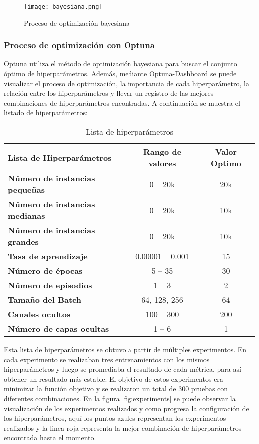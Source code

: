 \begin{figure}[ht]
    \centering
    \texttt{[image: bayesiana.png]}
    \caption{Proceso de optimización bayesiana}\label{fig:bayesiana}
\end{figure}

\subsubsection{Proceso de optimización con Optuna}
Optuna utiliza el método de optimización bayesiana para buscar el conjunto óptimo de
hiperparámetros. Además, mediante Optuna-Dashboard se puede visualizar el proceso de
optimización, la importancia de cada hiperparámetro, la relación entre los hiperparámetros
y llevar un registro de las mejores combinaciones de hiperparámetros encontradas. A 
continuación se muestra el listado de hiperparámetros:

\begin{table}[ht]
    \centering
    \begin{tabular}[ht]{l|c|c} 
        \textbf{Lista de Hiperparámetros} & \textbf{Rango de valores} & \textbf{Valor Optimo}\\
        \hline
        \textbf{Número de instancias pequeñas} & 0 -- 20k & 20k\\
        \textbf{Número de instancias medianas} & 0 -- 20k & 10k\\
        \textbf{Número de instancias grandes}  & 0 -- 20k & 10k \\
        \textbf{Tasa de aprendizaje} & 0.00001 -- 0.001 & 15 \\
        \textbf{Número de épocas} & 5 -- 35 & 30 \\ 
        \textbf{Número de episodios} & 1 -- 3 & 2 \\
        \textbf{Tamaño del Batch} & 64, 128, 256 & 64\\
        \textbf{Canales ocultos} & 100 -- 300 & 200 \\
        \textbf{Número de capas ocultas} & 1 -- 6 & 1 \\
    \end{tabular}
    \caption{Lista de hiperparámetros}
    \label{tab:hyperparams}
\end{table}

Esta lista de hiperparámetros se obtuvo a partir de múltiples experimentos. En cada 
experimento se realizaban tres entrenamientos con los mismos hiperparámetros y luego
se promediaba el resultado de cada métrica, para así obtener un resultado más estable.
El objetivo de estos experimentos era minimizar la función objetivo y se realizaron
un total de 300 pruebas con diferentes combinaciones. En la figura \ref{fig:experiments}
se puede observar la visualización de los experimentos realizados y como progresa la
configuración de los hiperparámetros, aquí los puntos azules representan los experimentos
realizados y la linea roja representa la mejor combinación de hiperparámetros encontrada
hasta el momento.

